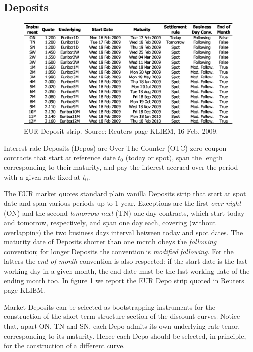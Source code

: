 \documentclass[11pt,reqno]{amsart}
\begin{document}
\subsection{Deposits}
\label{sec:Depo}
\begin{figure}[tp]
\centering
\includegraphics[scale=0.8]{./FigMktDepos}
\caption{EUR Deposit strip. Source: Reuters page KLIEM, 16 Feb. 2009.}
\label{fig:Deposits}
\end{figure}
Interest rate Deposits (Depos) are Over-The-Counter (OTC) zero coupon contracts that start at reference date $t_0$ (today or spot), span the length corresponding to their maturity, and pay the interest accrued over the period with a given rate fixed at $t_0$.
\par
The EUR market quotes standard plain vanilla Deposits strip that start at spot date and span various periods up to 1 year.
Exceptions are the first {\it over-night} (ON) and the second {\it tomorrow-next} (TN) one-day contracts, which start today and tomorrow, respectively, and span one day each, covering (without overlapping) the two business days interval between today and spot dates.
The maturity date of Deposits shorter than one month obeys the {\it following} convention; for longer Deposits the convention is {\it modified following}. For the latters the {\it end-of-month} convention is also respected: if the start date is the last working day in a given month, the end date must be the last working date of the ending month too.
In figure \ref{fig:Deposits} we report the EUR Depo strip quoted in Reuters page KLIEM.
\par
Market Deposits can be selected as bootstrapping instruments for the construction of the short term structure section of the discount curves. Notice that, apart ON, TN and SN, each Depo admits its own underlying rate tenor, corresponding to its maturity. Hence each Depo should be selected, in principle, for the construction of a different curve.
\end{document}

